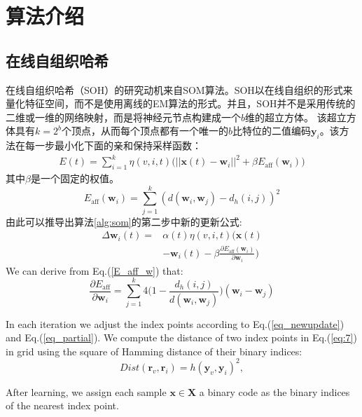 \section{算法介绍}
\subsection{在线自组织哈希}
在线自组织哈希（SOH）的研究动机来自SOM算法。SOH以在线自组织的形式来量化特征空间，而不是使用离线的EM算法的形式。并且，SOH并不是采用传统的二维或一维的网络映射，而是将神经元节点构建成一个$b$维的超立方体。 该超立方体具有$k=2^{b}$个顶点，从而每个顶点都有一个唯一的$b$比特位的二值编码$\mathbf{y}_{i}$。该方法在每一步最小化下面的亲和保持采样函数：
\begin{equation}\label{objective_soh}
\begin{split}
E(t) = \sum_{i=1}^{k} \eta(v, i, t) \big( ||\mathbf{x}(t) - \mathbf{w}_{i}||^{2} + \beta  E_{\mathrm{aff}}(\mathbf{w}_{i})\big)
\end{split}
\end{equation}
其中$\beta$是一个固定的权值。
\begin{equation}\label{E_aff_w}
E_{\mathrm{aff}}(\mathbf{w}_{i}) =  \sum_{j=1}^{k}(d(\mathbf{w}_{i}, \mathbf{w}_{j}) - d_{h}(i, j))^{2}
\end{equation}
由此可以推导出算法\ref{alg:som}的第二步中新的更新公式:
\begin{equation}\label{eq_newupdate}
\begin{split}
\Delta\mathbf{w}_{i}(t) = &  \alpha(t)\eta(v, i, t)\big(\mathbf{x}(t) \\ &- \mathbf{w}_{i}(t) -  \beta \frac{\partial E_{\mathrm{aff}}(\mathbf{w}_{i})}{\partial \mathbf{w}_{i}}\big)
\end{split}
\end{equation}
We can derive from Eq.(\ref{E_aff_w}) that:
\begin{equation}\label{eq_partial}
\frac{\partial E_{\mathrm{aff}}}{\partial \mathbf{w}_{i}} = \sum_{j=1}^{k}4 \Big(1 - \frac{d_{h}(i, j)}{d(\mathbf{w}_{i}, \mathbf{w}_{j})} \Big)(\mathbf{w}_{i} - \mathbf{w}_{j})
\end{equation}

In each iteration we adjust the index points according to Eq.(\ref{eq_newupdate}) and Eq.(\ref{eq_partial}). We compute the
distance of two index points in Eq.(\ref{eq:7}) in grid using the square of Hamming distance of their binary indices:
\begin{equation}\label{10}
Dist(\mathbf{r}_{v} , \mathbf{r}_{i}) = h(\mathbf{y}_{v}, \mathbf{y}_{i})^2,
\end{equation}

After learning, we assign each sample $\mathbf{x} \in \mathbf{X}$ a binary code as the binary indices of the nearest index point.